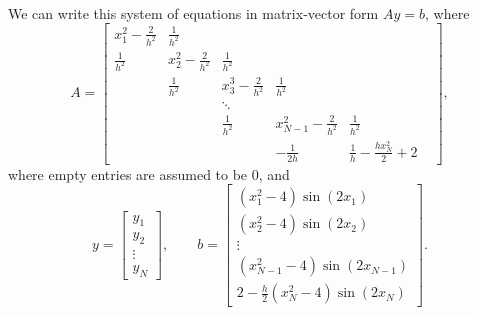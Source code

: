 \documentclass{homework}
\begin{document}
\begin{alphaparts}
\begin{align*}
		\end{align*}
		We can write this system of equations in matrix-vector form $Ay = b$, where
		\begin{equation*}
			A = \left[\begin{matrix}
				x_1^2-\frac{2}{h^2} & \frac{1}{h^2} &  &  & & \\
				\frac{1}{h^2} & x_2^2 - \frac{2}{h^2} & \frac{1}{h^2} &  &  & \\
				 & \frac{1}{h^2} & x_3^3 - \frac{2}{h^2} & \frac{1}{h^2} & &\\
			     & & \ddots &  & \\
				 &  & \frac{1}{h^2} & x_{N-1}^2 - \frac{2}{h^2} & \frac{1}{h^2} \\
				 &  &  & -\frac{1}{2h} & \frac{1}{h} - \frac{hx_N^2}{2} +2
			\end{matrix}\right],
		\end{equation*}
		where empty entries are assumed to be 0, and
		\begin{equation*}
			y = \left[\begin{matrix}y_1 \\ y_2 \\ \vdots \\ y_N\end{matrix}\right], \qquad b = \left[\begin{matrix}(x_1^2 - 4)\sin(2x_1) \\[0.3em] (x_2^2-4)\sin(2x_2) \\ \vdots \\ (x_{N-1}^2-4)\sin(2x_{N-1}) \\[0.3em] 2 - \frac{h}{2}(x_N^2 - 4)\sin(2x_N)\end{matrix}\right].
		\end{equation*}
		
		\questionpart
		

\end{alphaparts}
\end{document}

